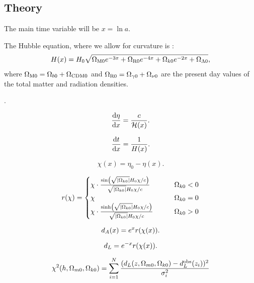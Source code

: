 \subsection{Theory}\label{sec:m1:theory}

The main time variable will be $x=\ln a$. 

The Hubble equation, where we allow for curvature is :
\begin{equation}\label{eq:m1:hubble_equation}
    \begin{split}
        H(x) = H_0\sqrt{\Omega_\mathrm{M0}e^{-3x} + \Omega_\mathrm{R0}e^{-4x} + \Omega_{k0}e^{-2x} + \Omega_{\Lambda 0}},
    \end{split}
\end{equation}
where $\Omega_\mathrm{M0} = \Omega_{b0} + {\Omega_{\text{CDM}0}}$ and $\Omega_{\mathrm{R}0} = \Omega_{\gamma 0} + \Omega_{\nu 0}$ are the present day values of the total matter and radiation densities. 

.

\begin{equation}\label{eq:m1:eta_diff_eq}
    \dv{\eta}{x} = \frac{c}{\mathcal{H}(x)}.
\end{equation}

\begin{equation}\label{eq:m1:t_diff_eq}
    \dv{t}{x} = \frac{1}{H(x)}.
\end{equation}

\begin{equation}\label{eq:m1:co_moving_distance_def}
    \chi(x) = \eta_0 -\eta(x).
\end{equation}

\begin{equation}\label{eq:m1:r_equation_def}
    r(\chi) = \begin{cases}
        \chi \cdot \frac{\sin\left(\sqrt{\abs{\Omega_{k0}}}H_0\chi/c\right)}{\sqrt{\abs{\Omega_{k0}}}H_0\chi/c} \qquad &\Omega_{k0} < 0 \\
        \chi \qquad &\Omega_{k0} = 0 \\
        \chi \cdot \frac{\sinh\left(\sqrt{\abs{\Omega_{k0}}}H_0\chi/c\right)}{\sqrt{\abs{\Omega_{k0}}}H_0\chi/c} \qquad &\Omega_{k0} > 0
    \end{cases}
\end{equation}

\begin{equation}\label{eq:m1:angular_distance_def}
    d_A(x) = e^{x}r(\chi(x)).
\end{equation}

\begin{equation}\label{eq:m1:luminosity_distance_def}
    d_L = e^{-x}r(\chi(x)).
\end{equation}


\begin{equation}\label{eq:m1:chi2_test_def}
    \chi^2(h, \Omega_{m0}, \Omega_{k0}) = \sum_{i=1}^N \frac{(d_L(z, \Omega_{m0}, \Omega_{k0}) - d_L^\mathrm{obs}(z_i))^2}{\sigma_i^2}
\end{equation}